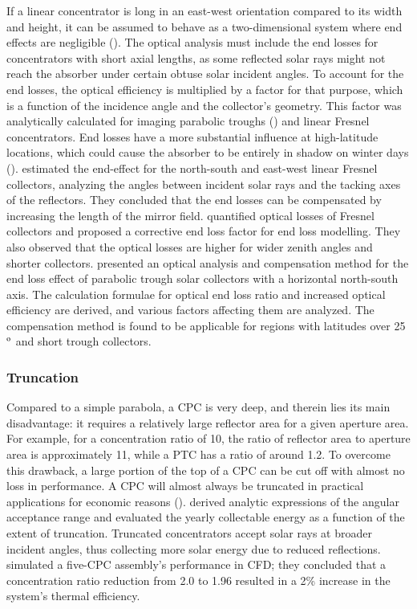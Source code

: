 If a linear concentrator is long in an east-west orientation compared to its width and height, it can be assumed to behave as a two-dimensional system where end effects are negligible (\cite{Eames1993a}). The optical analysis must include the end losses for concentrators with short axial lengths, as some reflected solar rays might not reach the absorber under certain obtuse solar incident angles. To account for the end losses, the optical efficiency is multiplied by a factor for that purpose, which is a function of the incidence angle and the collector's geometry. This factor was analytically calculated for imaging parabolic troughs (\cite{Rabl1985}) and linear Fresnel concentrators. End losses have a more substantial influence at high-latitude locations, which could cause the absorber to be entirely in shadow on winter days (\cite{Hongn2015}). \citet{Pu2011} estimated the end-effect for the north-south and east-west linear Fresnel collectors, analyzing the angles between incident solar rays and the tacking axes of the reflectors. They concluded that the end losses can be compensated by increasing the length of the mirror field. \citet{Heimsath2014} quantified optical losses of Fresnel collectors and proposed a corrective end loss factor for end loss modelling. They also observed that the optical losses are higher for wider zenith angles and shorter collectors. \citet{Xu2014} presented an optical analysis and compensation method for the end loss effect of parabolic trough solar collectors with a horizontal north-south axis. The calculation formulae for optical end loss ratio and increased optical efficiency are derived, and various factors affecting them are analyzed. The compensation method is found to be applicable for regions with latitudes over 25$^{\rm{o}}$ and short trough collectors.

\subsubsection{Truncation}

Compared to a simple parabola, a CPC is very deep, and therein lies its main disadvantage: it requires a relatively large reflector area for a given aperture area. For example, for a concentration ratio of 10, the ratio of reflector area to aperture area is approximately 11, while a PTC has a ratio of around 1.2. To overcome this drawback, a large portion of the top of a CPC can be cut off with almost no loss in performance. A CPC will almost always be truncated in practical applications for economic reasons (\cite{Rabl1976}). \citet{Carvalho1985} derived analytic expressions of the angular acceptance range and evaluated the yearly collectable energy as a function of the extent of truncation. Truncated concentrators accept solar rays at broader incident angles, thus collecting more solar energy due to reduced reflections. \citet{Francesconi2018} simulated a five-CPC assembly's performance in CFD; they concluded that a concentration ratio reduction from 2.0 to 1.96 resulted in a 2\% increase in the system's thermal efficiency.

